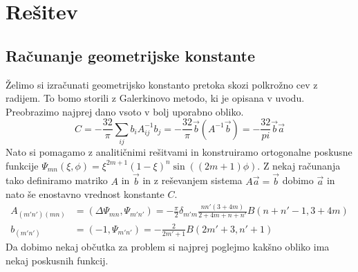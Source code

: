 \documentclass{article}
\begin{document}
\section{Rešitev}
\subsection{Računanje geometrijske konstante}
Želimo si izračunati geometrijsko konstanto pretoka skozi polkrožno cev z radijem. To bomo storili z Galerkinovo metodo, ki je opisana v uvodu. Preobrazimo najprej dano vsoto v bolj uporabno obliko.
\begin{equation}
	C =-\frac{32}{ \pi} \sum_{ij}  b_i A_{ij}^{-1} b_j = -\frac{32}{\pi}\vec{b}(A^{-1}\vec{b})=-\frac{32}{pi}\vec{b}\vec{a}
\end{equation}
Nato si pomagamo z analitičnimi rešitvami in konstruiramo ortogonalne poskusne funkcije $\Psi_{mn}(\xi,\phi) = \xi^{2m+1}(1-\xi)^n \sin((2m+1)\phi)$. Z nekaj računanja tako definiramo matriko $A$ in $\vec{b}$ in z reševanjem sistema $A\vec{a}=\vec{b}$ dobimo $\vec{a}$ in nato še enostavno vrednost konstante $C$.
\begin{align}
	A_{(m'n')(mn)} &= (\Delta\Psi_{mn}, \Psi_{m'n'}) = -\frac{\pi}{2}\delta_{m'm}\frac{nn'(3+4m)}{2+4m+n+n'}B(n+n'-1,3+4m) \\
	b_{(m'n')} &= (-1, \Psi_{m'n'}) = -\frac{2}{2m'+1}B(2m'+3,n'+1)
\end{align}
Da dobimo nekaj občutka za problem si najprej poglejmo kakšno obliko ima nekaj poskusnih funkcij.
\end{document}
